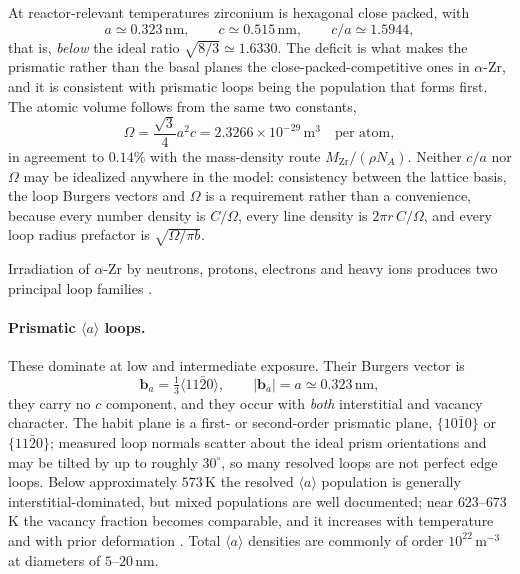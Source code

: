 \documentclass{article}
\newcommand{\aloop}{\ensuremath{\langle a\rangle}}
\newcommand{\bvec}{\bm b}
\begin{document}
At reactor-relevant temperatures zirconium is hexagonal close packed, with
\begin{equation}
  a\simeq0.323\,\mathrm{nm},\qquad c\simeq0.515\,\mathrm{nm},
  \qquad c/a\simeq1.5944,
  \label{eq:lattice}
\end{equation}
that is, \emph{below} the ideal ratio $\sqrt{8/3}\simeq1.6330$. The deficit is
what makes the prismatic rather than the basal planes the close-packed-competitive
ones in $\alpha$-Zr, and it is consistent with prismatic loops being the
population that forms first. The atomic volume follows from the same two
constants,
\begin{equation}
  \Omega=\frac{\sqrt3}{4}a^2c=2.3266\times10^{-29}\,\mathrm{m}^3
  \quad\text{per atom},
  \label{eq:atomvol}
\end{equation}
in agreement to $0.14\%$ with the mass-density route
$M_{\mathrm{Zr}}/(\rho N_A)$. Neither $c/a$ nor $\Omega$ may be idealized
anywhere in the model: consistency between the lattice basis, the loop Burgers
vectors and $\Omega$ is a requirement rather than a convenience, because every
number density is $C/\Omega$, every line density is $2\pi r\,C/\Omega$, and every
loop radius prefactor is $\sqrt{\Omega/\pi b}$.

Irradiation of $\alpha$-Zr by neutrons, protons, electrons and heavy ions
produces two principal loop families
\citep{jostsons1977nature,northwood1979characterization,griffiths1988review,adamson_irradiation_2019,onimus2020radiation}.

\paragraph{Prismatic \aloop{} loops.} These dominate at low and intermediate
exposure. Their Burgers vector is
\begin{equation}
  \bvec_a=\tfrac13\langle11\bar20\rangle,\qquad|\bvec_a|=a\simeq0.323\,\mathrm{nm},
  \label{eq:ba}
\end{equation}
they carry no $c$ component, and they occur with \emph{both} interstitial and
vacancy character. The habit plane is a first- or second-order prismatic plane,
$\{10\bar10\}$ or $\{11\bar20\}$; measured loop normals scatter about the ideal
prism orientations and may be tilted by up to roughly $30^\circ$, so many
resolved loops are not perfect edge loops. Below approximately $573\,$K the
resolved \aloop{} population is generally interstitial-dominated, but mixed
populations are well documented; near $623$--$673\,$K the vacancy fraction
becomes comparable, and it increases with temperature and with prior deformation
\citep{jostsons1977nature,gilbert1979damage,griffiths1988review,liu2020two}.
Total \aloop{} densities are commonly of order $10^{22}\,\mathrm{m}^{-3}$ at
diameters of $5$--$20\,$nm.
\end{document}
